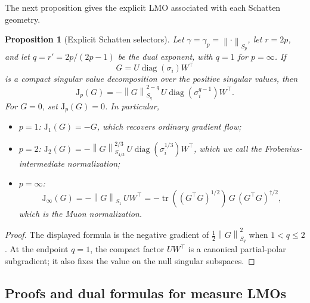 \documentclass{article}
\newtheorem{proposition}[theorem]{Proposition}
\newcommand{\mJ}{\mathrm{J}}
\newcommand{\tr}{\operatorname{tr}}
\newcommand{\diag}{\operatorname{diag}}
\newcommand{\norm}[1]{\left\lVert #1 \right\rVert}
\begin{document}
The next proposition gives the explicit LMO associated with each Schatten geometry.
\begin{proposition}[Explicit Schatten selectors]
\label{prop:schatten}
Let $\gamma=\gamma_p=\norm{\cdot}_{S_p}$, let $r=2p$, and let
$q=r'=2p/(2p-1)$ be the dual exponent, with $q=1$ for $p=\infty$. If
$$
G=U\diag(\sigma_i)W^\top
$$
is a compact singular value decomposition over the positive singular values,
then
$$
\mJ_p(G)
=
-\norm{G}_{S_q}^{2-q}\,
U\diag(\sigma_i^{q-1})W^\top.
$$
For $G=0$, set $\mJ_p(G)=0$.
In particular,
\begin{itemize}
\item $p=1$: $\mJ_1(G)=-G$, which recovers ordinary gradient flow;
\item $p=2$: $\mJ_2(G)=-\norm{G}_{S_{4/3}}^{2/3}\,U\diag(\sigma_i^{1/3})W^\top$, which we call the Frobenius-intermediate normalization;
\item $p=\infty$:
\begin{equation}
\label{eq:muon-selector}
\mJ_\infty(G)
=
-\norm{G}_{S_1}\,UW^\top
=
-\tr((G^\top G)^{1/2})\,G\,(G^\top G)^{\dagger/2},
\end{equation}
which is the Muon normalization.
\end{itemize}
\end{proposition}

\begin{proof}
The displayed formula is the negative gradient of
$\frac12\norm{G}_{S_q}^2$ when $1<q\le2$. At the endpoint $q=1$, the compact
factor $UW^\top$ is a canonical partial-polar subgradient; it also fixes
the value on the null singular subspaces.
\end{proof}


\subsection{Proofs and dual formulas for measure LMOs}
\end{document}
